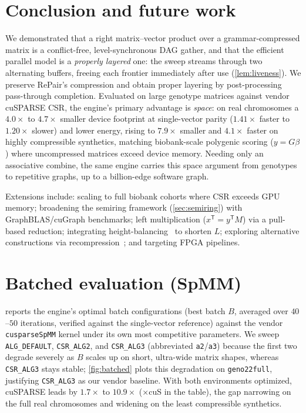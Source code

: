 \documentclass[twoside,leqno,twocolumn]{article}
\begin{document}
\section{Conclusion and future work}
\label{sec:conclusion}

We demonstrated that a right matrix--vector product over a grammar-compressed matrix is a conflict-free, level-synchronous DAG gather, and that the efficient parallel model is a \emph{properly layered} one: the sweep streams through two alternating buffers, freeing each frontier immediately after use (\cref{lem:liveness}). We preserve RePair's compression and obtain proper layering by post-processing pass-through completion.
Evaluated on large genotype matrices against vendor cuSPARSE CSR, the engine's primary advantage is \emph{space}: on real chromosomes a $4.0\times$ to $4.7\times$ smaller device footprint at single-vector parity ($1.41\times$ faster to $1.20\times$ slower) and lower energy, rising to $7.9\times$ smaller and $4.1\times$ faster on highly compressible synthetics, matching biobank-scale polygenic scoring ($y=G\beta$) where uncompressed matrices exceed device memory. Needing only an associative combine, the same engine carries this space argument from genotypes to repetitive graphs, up to a billion-edge software graph.

Extensions include: scaling to full biobank cohorts where CSR exceeds GPU memory; broadening the semiring framework (\cref{sec:semiring}) with GraphBLAS/cuGraph benchmarks; left multiplication ($x^{\mathsf{T}}=y^{\mathsf{T}}M$) via a pull-based reduction; integrating height-balancing~\cite{ganardi,balancing-urbina} to shorten $L$; exploring alternative constructions via recompression~\cite{jez,recompression}; and targeting FPGA pipelines.

\appendix

\section{Batched evaluation (SpMM)}
\label{app:batched}

 reports the engine's optimal batch configurations (best batch $B$, averaged over $40$--$50$ iterations, verified against the single-vector reference) against the vendor \texttt{cusparseSpMM} kernel under its own most competitive parameters. We sweep \texttt{ALG\_DEFAULT}, \texttt{CSR\_ALG2}, and \texttt{CSR\_ALG3} (abbreviated \texttt{a2}/\texttt{a3}) because the first two degrade severely as $B$ scales up on short, ultra-wide matrix shapes, whereas \texttt{CSR\_ALG3} stays stable; \cref{fig:batched} plots this degradation on \texttt{geno22full}, justifying \texttt{CSR\_ALG3} as our vendor baseline. With both environments optimized, cuSPARSE leads by $1.7\times$ to $10.9\times$ ($\times$cuS in the table), the gap narrowing on the full real chromosomes and widening on the least compressible synthetics.
\end{document}

